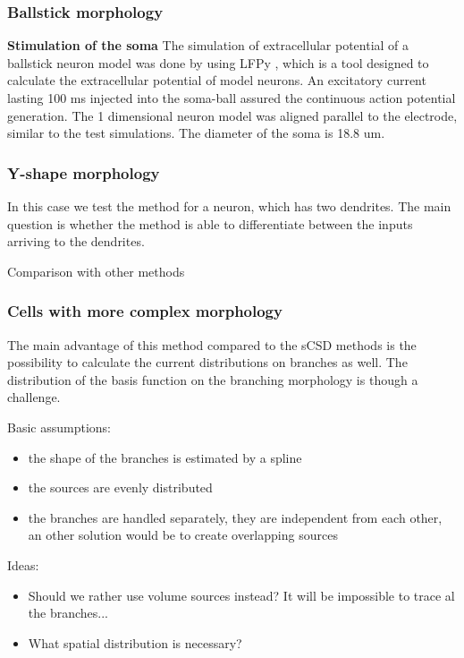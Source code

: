 \documentclass[12pt,a4paper]{article}
\begin{document}
\subsubsection{Ballstick morphology}


\textbf{Stimulation of the soma}
The simulation of extracellular potential of a ballstick neuron model was done by using LFPy \cite{LFPy}, which is a tool designed to calculate the extracellular potential of model neurons. An excitatory current lasting 100 ms injected into the soma-ball assured the continuous action potential generation.  The 1 dimensional neuron model was aligned parallel to the electrode, similar to the test simulations. The diameter of the soma is 18.8 um. 

\subsubsection{Y-shape morphology}
In this case we test the method for a neuron, which has two dendrites.
The main question is whether the method is able to differentiate between the inputs arriving to the dendrites. 

Comparison with other methods

\subsubsection{Cells with more complex morphology}
The main advantage of this method compared to the sCSD methods is the possibility to calculate the current distributions on branches as well. The distribution of the basis function on the branching morphology is though a challenge.

Basic assumptions:
\begin{itemize}
\item the shape of the branches is estimated by a spline
\item the sources are evenly distributed
\item the branches are handled separately, they are independent from each other, an other solution would be to create overlapping sources
\end{itemize}

Ideas:
\begin{itemize}
\item Should we rather use volume sources instead? It will be impossible to trace al the branches...
\item What spatial distribution is necessary? 
\end{itemize}
\end{document}
